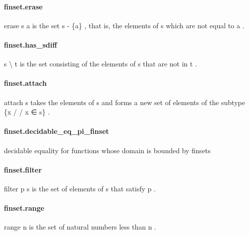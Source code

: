 \documentclass{article}
\begin{document}
\paragraph{finset.erase}
\par
\colorbox[RGB]{253,246,227}{{{{\color[RGB]{101, 123, 131} erase s a }}}} is the set 
\colorbox[RGB]{253,246,227}{{{{\color[RGB]{101, 123, 131} s  }}}{{{\color[RGB]{181, 137, 0} - }}}{{{\color[RGB]{101, 123, 131}  \{a\} }}}}, that is, the elements of 
\colorbox[RGB]{253,246,227}{{{{\color[RGB]{101, 123, 131} s }}}} which are
not equal to 
\colorbox[RGB]{253,246,227}{{{{\color[RGB]{101, 123, 131} a }}}}.
\paragraph{finset.has\_sdiff}
\par
\colorbox[RGB]{253,246,227}{{{{\color[RGB]{101, 123, 131} s \textbackslash{} t }}}} is the set consisting of the elements of 
\colorbox[RGB]{253,246,227}{{{{\color[RGB]{101, 123, 131} s }}}} that are not in 
\colorbox[RGB]{253,246,227}{{{{\color[RGB]{101, 123, 131} t }}}}.
\paragraph{finset.attach}
\par
\colorbox[RGB]{253,246,227}{{{{\color[RGB]{101, 123, 131} attach s }}}} takes the elements of 
\colorbox[RGB]{253,246,227}{{{{\color[RGB]{101, 123, 131} s }}}} and forms a new set of elements of the
subtype 
\colorbox[RGB]{253,246,227}{{{{\color[RGB]{101, 123, 131} \{x  }}}{{{\color[RGB]{181, 137, 0} / }}}{{{\color[RGB]{181, 137, 0} / }}}{{{\color[RGB]{101, 123, 131}  x ∈ s\} }}}}.
\paragraph{finset.decidable\_eq\_pi\_finset}
\par
decidable equality for functions whose domain is bounded by finsets
\paragraph{finset.filter}
\par
\colorbox[RGB]{253,246,227}{{{{\color[RGB]{101, 123, 131} filter p s }}}} is the set of elements of 
\colorbox[RGB]{253,246,227}{{{{\color[RGB]{101, 123, 131} s }}}} that satisfy 
\colorbox[RGB]{253,246,227}{{{{\color[RGB]{101, 123, 131} p }}}}.
\paragraph{finset.range}
\par
\colorbox[RGB]{253,246,227}{{{{\color[RGB]{101, 123, 131} range n }}}} is the set of natural numbers less than 
\colorbox[RGB]{253,246,227}{{{{\color[RGB]{101, 123, 131} n }}}}.
\end{document}
